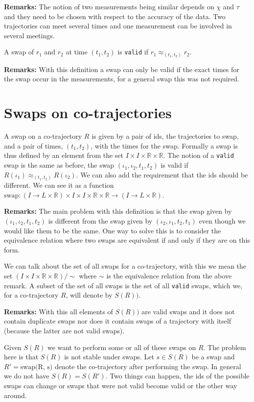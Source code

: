 \documentclass[11pt]{article}
\begin{document}
\textbf{Remarks:} The notion of two measurements being similar depends on
\(\chi\) and \(\tau\) and they need to be chosen with respect to the
accuracy of the data. Two trajectories can meet several times and one
measurement can be involved in several meetings.

A swap of \(r_1\) and \(r_2\) at time \((t_1, t_2)\) is \texttt{valid} if
\(r_1 \approx_{(t_1, t_2)} r_2\).

\textbf{Remarks:} With this definition a swap can only be valid if the exact
times for the swap occur in the measurements, for a general swap this
was not required.
\section{Swaps on co-trajectories}
\label{sec:org1bcd558}
A swap on a co-trajectory \(R\) is given by a pair of ids, the
trajectories to swap, and a pair of times, \((t_1, t_2)\), with the
times for the swap. Formally a swap is thus defined by an element from
the set \(I \times I \times \mathbb{R} \times \mathbb{R}\). The notion
of a \texttt{valid} swap is the same as before, the swap \((\iota_1, \iota_2,
t_1, t_2)\) is valid if \(R(\iota_1) \approx_{(t_1, t_2)}
R(\iota_2)\). We can also add the requirement that the ids should be
different. We can see it as a function \(\textrm{swap}: (I \to L
\times \mathbb{R}) \times I \times I \times \mathbb{R} \times
\mathbb{R} \to (I \to L \times \mathbb{R})\).

\textbf{Remarks:} The main problem with this definition is that the swap
given by \((\iota_1, \iota_2, t_1, t_2)\) is different from the swap
given by \((\iota_2, \iota_1, t_2, t_1)\) even though we would like
them to be the same. One way to solve this is to consider the
equivalence relation where two swaps are equivalent if and only if
they are on this form.

We can talk about the set of all swaps for a co-trajectory, with this
we mean the set \((I \times I \times \mathbb{R} \times
\mathbb{R})/\sim\) where \(\sim\) is the equivalence relation from the
above remark. A subset of the set of all swaps is the set of all
\texttt{valid} swaps, which we, for a co-trajectory \(R\), will denote by
\(S(R))\).

\textbf{Remarks:} With this all elements of \(S(R))\) are valid swaps and it
 does not contain duplicate swaps nor does it contain swaps of a
 trajectory with itself (because the latter are not valid swaps).

Given \(S(R)\) we want to perform some or all of these swaps on \(R\).
The problem here is that \(S(R)\) is not stable under swaps. Let \(s
\in S(R)\) be a swap and \(R' = \textrm{swap(R, s)}\) denote the
co-trajectory after performing the swap. In general we do not have
\(S(R) = S(R')\). Two things can happen, the ids of the possible swaps
can change or swaps that were not valid become valid or the other way
around.
\end{document}
